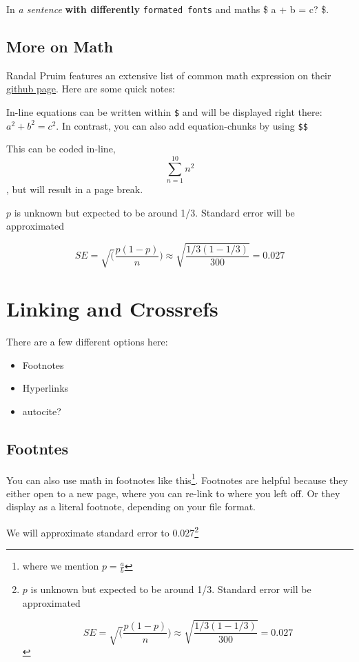 \documentclass[
]{book}
\begin{document}
In \emph{a sentence} \textbf{with differently} \texttt{formated\ fonts} and maths \$ a + b
= c? \$.

\hypertarget{more-on-math}{%
\subsection{More on Math}\label{more-on-math}}

Randal Pruim features an extensive list of common math expression on
their \href{https://rpruim.github.io/s341/S19/from-class/MathinRmd.html}{github
page}. Here
are some quick notes:

In-line equations can be written within \texttt{\$} and will be displayed right
there: \(a^2 + b^2 = c^2\). In contrast, you can also add equation-chunks
by using \texttt{\$\$}

This can be coded in-line, \[\sum_{n=1}^{10} n^2\], but will result in a
page break.

\(p\) is unknown but expected to be around 1/3. Standard error will be
approximated

\[
SE = \sqrt(\frac{p(1-p)}{n}) \approx \sqrt{\frac{1/3 (1 - 1/3)} {300}} = 0.027
\]

\hypertarget{linking-and-crossrefs}{%
\section*{Linking and Crossrefs}\label{linking-and-crossrefs}}

There are a few different options here:

\begin{itemize}
\item
  Footnotes
\item
  Hyperlinks
\item
  autocite?
\end{itemize}

\hypertarget{footntes}{%
\subsection{Footntes}\label{footntes}}

You can also use math in footnotes like this\footnote{where we mention \(p = \frac{a}{b}\)}. Footnotes
are helpful because they either open to a new page, where you can
re-link to where you left off. Or they display as a literal footnote,
depending on your file format.

We will approximate standard error to 0.027\footnote{\(p\) is unknown but expected to be around 1/3. Standard
  error will be approximated

  \[
  SE = \sqrt(\frac{p(1-p)}{n}) \approx \sqrt{\frac{1/3 (1 - 1/3)} {300}} = 0.027
  \]}
\end{document}
